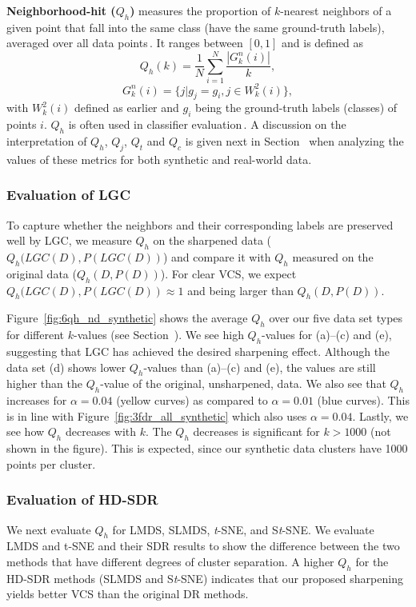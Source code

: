 \documentclass[sagev,Afour,times]{sagej}
\begin{document}
\noindent\textbf{Neighborhood-hit ($Q_h$)} measures the proportion of $k$-nearest neighbors of a given point that fall into the same class (have the same ground-truth labels), averaged over all data points\,\cite{neighborhoodhit,coimbra21}. It ranges between $[0,1]$ and is defined as
\begin{equation}
    \label{Eq6}
    	Q_h(k) = \frac{1}{N} \sum_{i=1}^{N} \frac{|G_k^n(i)|}{k},
\end{equation}
\begin{equation}
    \label{Eq7}
        G_k^n(i)=\{j | g_j = g_i, j \in W_k^2(i)\},
\end{equation}
with $W_k^2(i)$ defined as earlier and $g_i$ being the ground-truth labels (classes) of points $i$. $Q_h$ is often used in classifier evaluation\,\cite{mateusDR_survey2019}.
A discussion on the interpretation of $Q_h$, $Q_j$, $Q_t$ and $Q_c$ is given next in Section~ when analyzing the values of these metrics for both synthetic and real-world data.

\subsubsection{Evaluation of LGC}
\label{sec:evaluation_LGC}
%
To capture whether the neighbors and their corresponding labels are preserved well by LGC, we measure $Q_h$ on the sharpened data ($Q_h(LGC(D),P(LGC(D))$) and compare it with $Q_h$ measured on the original data ($Q_h(D,P(D))$). For clear VCS, we expect $Q_h(LGC(D),P(LGC(D)) \approx 1$ and being larger than $Q_h(D,P(D))$.

Figure~\ref{fig:6qh_nd_synthetic} shows the average $Q_h$ over our five data set types for different $k$-values (see Section~). We see high $Q_h$-values for (a)--(c) and (e), suggesting that LGC has achieved the desired sharpening effect. Although the data set (d) shows lower $Q_h$-values than (a)--(c) and (e), the values are still higher than the $Q_h$-value of the original, unsharpened, data.
We also see that $Q_h$ increases for $\alpha=0.04$ (yellow curves) as compared to $\alpha=0.01$ (blue curves). This is in line with Figure~\ref{fig:3fdr_all_synthetic} which also uses $\alpha=0.04$. Lastly, we see how $Q_h$ decreases with $k$. The $Q_h$ decreases is significant for $k >1000$ (not shown in the figure). This is expected, since our synthetic data clusters have 1000 points per cluster.

\subsubsection{Evaluation of HD-SDR}
\label{sec:evaluation_HD-SDR}
%
We next evaluate $Q_h$ for LMDS, SLMDS, \emph{t}-SNE, and S\emph{t}-SNE. We evaluate LMDS and t-SNE and their SDR results to show the difference between the two methods that have different degrees of cluster separation. A higher $Q_h$ for the HD-SDR methods (SLMDS and S\emph{t}-SNE) indicates that our proposed sharpening yields better VCS than the original DR methods.
\end{document}
